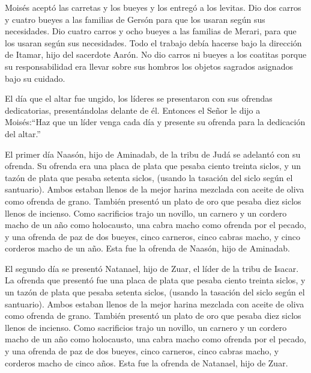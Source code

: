  Moisés aceptó las carretas y los bueyes y los entregó a los
levitas.  Dio dos carros y cuatro bueyes a las familias de
Gersón para que los usaran según sus necesidades.  Dio
cuatro carros y ocho bueyes a las familias de Merari, para que los
usaran según sus necesidades. Todo el trabajo debía hacerse bajo la
dirección de Itamar, hijo del sacerdote Aarón.  No dio
carros ni bueyes a los coatitas porque su responsabilidad era llevar
sobre sus hombros los objetos sagrados asignados bajo su cuidado.

 El día que el altar fue ungido, los líderes se presentaron
con sus ofrendas dedicatorias, presentándolas delante de él.
 Entonces el Señor le dijo a Moisés:``Haz que un líder
venga cada día y presente su ofrenda para la dedicación del altar.''

 El primer día Naasón, hijo de Aminadab, de la tribu de
Judá se adelantó con su ofrenda.  Su ofrenda era una placa
de plata que pesaba ciento treinta siclos, y un tazón de plata que
pesaba setenta siclos, (usando la tasación del siclo según el
santuario). Ambos estaban llenos de la mejor harina mezclada con aceite
de oliva como ofrenda de grano.  También presentó un plato
de oro que pesaba diez siclos llenos de incienso. Como sacrificios trajo
 un novillo, un carnero y un cordero macho de un año como
holocausto,  una cabra macho como ofrenda por el pecado,
 y una ofrenda de paz de dos bueyes, cinco carneros, cinco
cabras macho, y cinco corderos macho de un año. Esta fue la ofrenda de
Naasón, hijo de Aminadab.

 El segundo día se presentó Natanael, hijo de Zuar, el
líder de la tribu de Isacar.  La ofrenda que presentó fue
una placa de plata que pesaba ciento treinta siclos, y un tazón de plata
que pesaba setenta siclos, (usando la tasación del siclo según el
santuario). Ambos estaban llenos de la mejor harina mezclada con aceite
de oliva como ofrenda de grano.  También presentó un plato
de oro que pesaba diez siclos llenos de incienso. Como sacrificios trajo
 un novillo, un carnero y un cordero macho de un año como
holocausto,  una cabra macho como ofrenda por el pecado,
 y una ofrenda de paz de dos bueyes, cinco carneros, cinco
cabras macho, y corderos macho de cinco años. Esta fue la ofrenda de
Natanael, hijo de Zuar.

